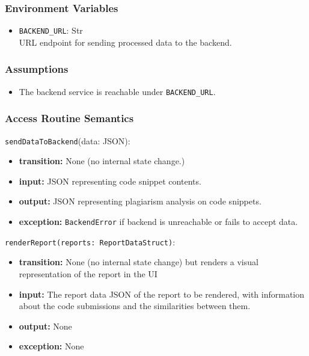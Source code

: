 \documentclass[12pt, titlepage]{article}
\begin{document}
\subsubsection{Environment Variables}

\begin{itemize}
    \item \texttt{BACKEND\_URL}: Str \\ 
    URL endpoint for sending processed data to the backend.
\end{itemize}

\subsubsection{Assumptions}

\begin{itemize}
    \item The backend service is reachable under \texttt{BACKEND\_URL}.
\end{itemize}

\subsubsection{Access Routine Semantics}

\noindent \texttt{sendDataToBackend}(data: JSON):
\begin{itemize}
    \item \textbf{transition:} None (no internal state change.)
    \item \textbf{input:} JSON representing code snippet contents.
    \item \textbf{output:} JSON representing plagiarism analysis on code snippets.
    \item \textbf{exception:} \texttt{BackendError} if backend is unreachable or fails to accept data.
\end{itemize}

\noindent \texttt{renderReport(reports: ReportDataStruct)}:
\begin{itemize}
    \item \textbf{transition:} None (no internal state change) but renders a visual representation of the 
    report in the UI
    \item \textbf{input:} The report data JSON of the report to be rendered,
    with information about the code submissions and the similarities between
    them.
    \item \textbf{output:} None
    \item \textbf{exception:} None
\end{itemize}
\end{document}
